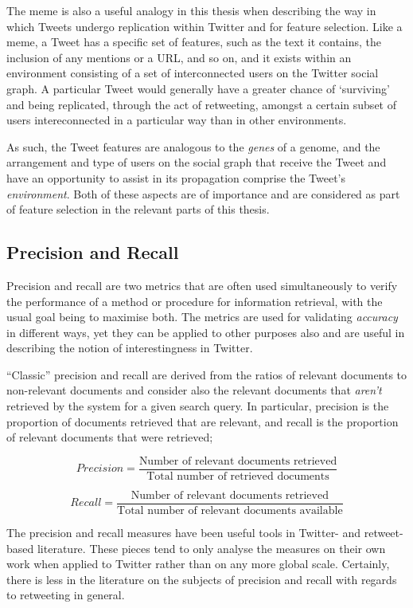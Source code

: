The meme is also a useful analogy in this thesis when describing the way in which Tweets undergo replication within Twitter and for feature selection. Like a meme, a Tweet has a specific set of features, such as the text it contains, the inclusion of any mentions or a URL, and so on, and it exists within an environment consisting of a set of interconnected users on the Twitter social graph. A particular Tweet would generally have a greater chance of `surviving' and being replicated, through the act of retweeting, amongst a certain subset of users intereconnected in a particular way than in other environments.

As such, the Tweet features are analogous to the \textit{genes} of a genome, and the arrangement and type of users on the social graph that receive the Tweet and have an opportunity to assist in its propagation comprise the Tweet's \textit{environment}. Both of these aspects are of importance and are considered as part of feature selection in the relevant parts of this thesis.


\subsection{Precision and Recall}
Precision and recall are two metrics that are often used simultaneously to verify the performance of a method or procedure for information retrieval, with the usual goal being to maximise both. The metrics are used for validating \textit{accuracy} in different ways, yet they can be applied to other purposes also and are useful in describing the notion of interestingness in Twitter.

``Classic'' precision and recall are derived from the ratios of relevant documents to non-relevant documents and consider also the relevant documents that \textit{aren't} retrieved by the system for a given search query. In particular, precision is the proportion of documents retrieved that are relevant, and recall is the proportion of relevant documents that were retrieved;

\[	
	Precision = \frac{\text{Number of relevant documents retrieved}}{\text{Total number of retrieved documents}}
\]

\[
	Recall = \frac{\text{Number of relevant documents retrieved}}{\text{Total number of relevant documents available}}
\]

The precision and recall measures have been useful tools in Twitter- and retweet-based literature. These pieces tend to only analyse the measures on their own work when applied to Twitter rather than on any more global scale. Certainly, there is less in the literature on the subjects of precision and recall with regards to retweeting in general.

